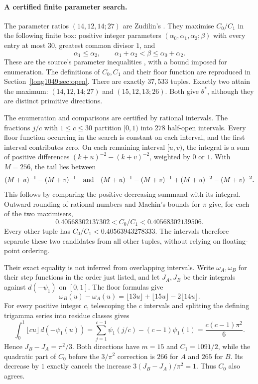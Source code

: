 \documentclass[11pt]{article}
\begin{document}
\paragraph{A certified finite parameter search.}
The parameter ratios $(14,12,14;27)$ are Zudilin's \cite[p.~162]{zudilin2004}.
They maximise $C_0/C_1$ in the following finite box: positive integer
parameters $(\alpha_0,\alpha_1,\alpha_2;\beta)$ with every entry at most
$30$, greatest common divisor $1$, and
\[
 \alpha_1\le\alpha_2,\qquad
 \alpha_1+\alpha_2<\beta\le\alpha_0+\alpha_2.
\]
These are the source's parameter inequalities
\cite[Sec.~5, p.~161]{zudilin2004}, with a bound imposed for enumeration.
The definitions of $C_0,C_1$ and their floor function are reproduced in
Section~\ref{long1049:sec:open}. There are exactly $37{,}533$ tuples.
Exactly two attain the maximum: $(14,12,14;27)$ and $(15,12,13;26)$.
Both give $\theta^*$, although they are distinct primitive directions.

The enumeration and comparisons are certified by rational intervals.
The fractions $j/c$ with $1\le c\le30$ partition $[0,1)$ into $278$
half-open intervals. Every floor function occurring in the search is
constant on each interval, and the first interval contributes zero. On each remaining interval $[u,v)$,
the integral is a sum of positive differences
$(k+u)^{-2}-(k+v)^{-2}$, weighted by $0$ or $1$. With $M=256$, the tail
lies between
\[
 (M+u)^{-1}-(M+v)^{-1}
 \quad\hbox{and}\quad
 (M+u)^{-1}-(M+v)^{-1}+(M+u)^{-2}-(M+v)^{-2}.
\]
This follows by comparing the positive decreasing summand with its
integral. Outward rounding of rational numbers and Machin's bounds for
$\pi$ give, for each of the two maximisers,
\[
 0.40568302137302<C_0/C_1<0.40568302139506.
\]
Every other tuple has $C_0/C_1<0.40563943278333$. The intervals therefore
separate these two candidates from all other tuples, without relying
on floating-point ordering.

Their exact equality is not inferred from overlapping intervals.
Write $\omega_A,\omega_B$ for their step functions in the order just
listed, and let $J_A,J_B$ be their integrals against $d(-\psi_1)$
on $[0,1]$. The floor formulas give
\[
 \omega_B(u)-\omega_A(u)
 =\lfloor13u\rfloor+\lfloor15u\rfloor-2\lfloor14u\rfloor.
\]
For every positive integer $c$, telescoping the $c$ intervals and
splitting the defining trigamma series into residue classes gives
\[
 \int_0^1\lfloor cu\rfloor\,d(-\psi_1(u))
 =\sum_{j=1}^{c-1}\psi_1(j/c)-(c-1)\psi_1(1)
 =\frac{c(c-1)\pi^2}{6}.
\]
Hence $J_B-J_A=\pi^2/3$. Both directions have $m=15$ and
$C_1=1091/2$, while the quadratic part of $C_0$ before the $3/\pi^2$ correction is
$266$ for $A$ and $265$ for $B$. Its decrease by $1$ exactly cancels
the increase $3(J_B-J_A)/\pi^2=1$. Thus $C_0$ also agrees.
\end{document}

